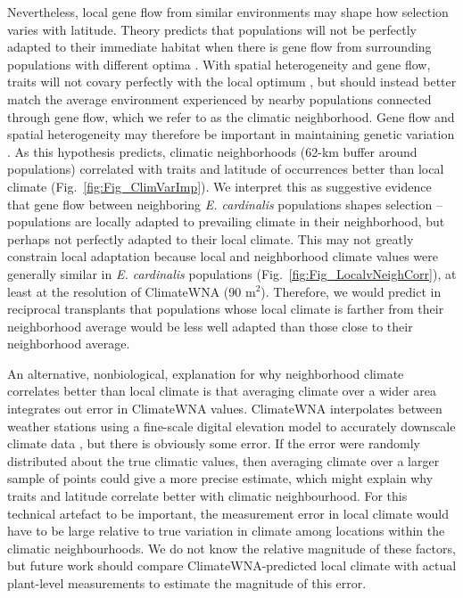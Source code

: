 \documentclass[11pt, oneside]{article}
\begin{document}
Nevertheless, local gene flow from similar environments may shape how selection varies with latitude. Theory predicts that populations will not be perfectly adapted to their immediate habitat when there is gene flow from surrounding populations with different optima \citep{Lenormand_2002}. With spatial heterogeneity and gene flow, traits will not covary perfectly with the local optimum \citep{Slatkin_1978, Paul_etal_2011, Hadfield_2016}, but should instead better match the average environment experienced by nearby populations connected through gene flow, which we refer to as the climatic neighborhood. Gene flow and spatial heterogeneity may therefore be important in maintaining genetic variation \citep{Yeaman_Jarvis_2006}. As this hypothesis predicts, climatic neighborhoods (62-km buffer around populations) correlated with traits and latitude of occurrences better than local climate (Fig.~\ref{fig:Fig_ClimVarImp}). We interpret this as suggestive evidence that gene flow between neighboring \textit{E. cardinalis} populations shapes selection -- populations are locally adapted to prevailing climate in their neighborhood, but perhaps not perfectly adapted to their local climate. This may not greatly constrain local adaptation because local and neighborhood climate values were generally similar in \textit{E. cardinalis} populations (Fig.~\ref{fig:Fig_LocalvNeighCorr}), at least at the resolution of ClimateWNA (90 m$^2$). Therefore, we would predict in reciprocal transplants that populations whose local climate is farther from their neighborhood average would be less well adapted than those close to their neighborhood average.

An alternative, nonbiological, explanation for why neighborhood climate correlates better than local climate is that averaging climate over a wider area integrates out error in ClimateWNA values. ClimateWNA interpolates between weather stations using a fine-scale digital elevation model to accurately downscale climate data \citep{Wang_etal_2012}, but there is obviously some error. If the error were randomly distributed about the true climatic values, then averaging climate over a larger sample of points could give a more precise estimate, which might explain why traits and latitude correlate better with climatic neighbourhood. For this technical artefact to be important, the measurement error in local climate would have to be large relative to true variation in climate among locations within the climatic neighbourhoods. We do not know the relative magnitude of these factors, but future work should compare ClimateWNA-predicted local climate with actual plant-level measurements to estimate the magnitude of this error. 
\end{document}
